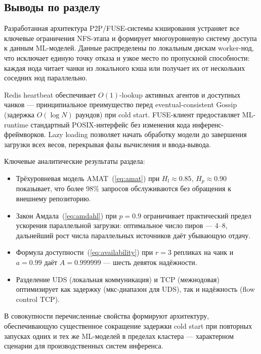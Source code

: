 \subsection{Выводы по разделу}

Разработанная архитектура P2P/FUSE-системы кэширования устраняет все ключевые ограничения NFS-этапа и формирует многоуровневую систему доступа к данным ML-моделей. Данные распределены по локальным дискам worker-нод, что исключает единую точку отказа и узкое место по пропускной способности: каждая нода читает чанки из локального кэша или получает их от нескольких соседних нод параллельно.

Redis heartbeat обеспечивает $O(1)$-lookup активных агентов и доступных чанков --- принципиальное преимущество перед eventual-consistent Gossip (задержка $O(\log N)$ раундов) при cold start. FUSE-клиент предоставляет ML-runtime стандартный POSIX-интерфейс без изменения кода инференс-фреймворков. Lazy loading позволяет начать обработку модели до завершения загрузки всех весов, перекрывая фазы вычисления и ввода-вывода.

Ключевые аналитические результаты раздела:
\begin{itemize}[leftmargin=*]
  \item Трёхуровневая модель AMAT~(\ref{eq:amat}) при $H_l \approx 0.85$, $H_p \approx 0.90$ показывает, что более 98\% запросов обслуживаются без обращения к внешнему репозиторию.
  \item Закон Амдала~(\ref{eq:amdahl}) при $p = 0.9$ ограничивает практический предел ускорения параллельной загрузки: оптимальное число пиров --- 4--8, дальнейший рост числа параллельных источников даёт убывающую отдачу.
  \item Формула доступности~(\ref{eq:availability}) при $r = 3$ репликах на чанк и $a = 0.99$ даёт $A = 0.999999$ --- шесть девяток надёжности.
  \item Разделение UDS (локальная коммуникация) и TCP (межнодовая) оптимизирует как задержку (мкс-диапазон для UDS), так и надёжность (flow control TCP).
\end{itemize}

В совокупности перечисленные свойства формируют архитектуру, обеспечивающую существенное сокращение задержки cold start при повторных запусках одних и тех же ML-моделей в пределах кластера --- характерном сценарии для производственных систем инференса.
